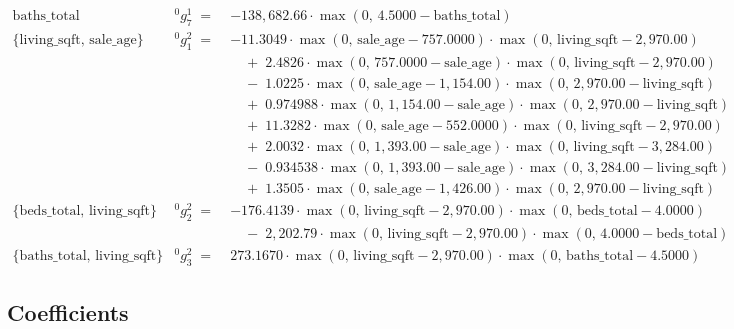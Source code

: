 \documentclass[
]{article}
\begin{document}
\[\begin{array}{lrl}
  \text{baths\_total} & {}^{0}g^{1}_{7} \;=\; & -138,682.66 \cdot \max(0,\, 4.5000 - \text{baths\_total}) \\
  \{\text{living\_sqft},\, \text{sale\_age}\} & {}^{0}g^{2}_{1} \;=\; & -11.3049 \cdot \max(0,\, \text{sale\_age} - 757.0000) \cdot \max(0,\, \text{living\_sqft} - 2,970.00) \\
  & & \quad + \; 2.4826 \cdot \max(0,\, 757.0000 - \text{sale\_age}) \cdot \max(0,\, \text{living\_sqft} - 2,970.00) \\
  & & \quad - \; 1.0225 \cdot \max(0,\, \text{sale\_age} - 1,154.00) \cdot \max(0,\, 2,970.00 - \text{living\_sqft}) \\
  & & \quad + \; 0.974988 \cdot \max(0,\, 1,154.00 - \text{sale\_age}) \cdot \max(0,\, 2,970.00 - \text{living\_sqft}) \\
  & & \quad + \; 11.3282 \cdot \max(0,\, \text{sale\_age} - 552.0000) \cdot \max(0,\, \text{living\_sqft} - 2,970.00) \\
  & & \quad + \; 2.0032 \cdot \max(0,\, 1,393.00 - \text{sale\_age}) \cdot \max(0,\, \text{living\_sqft} - 3,284.00) \\
  & & \quad - \; 0.934538 \cdot \max(0,\, 1,393.00 - \text{sale\_age}) \cdot \max(0,\, 3,284.00 - \text{living\_sqft}) \\
  & & \quad + \; 1.3505 \cdot \max(0,\, \text{sale\_age} - 1,426.00) \cdot \max(0,\, 2,970.00 - \text{living\_sqft}) \\
  \{\text{beds\_total},\, \text{living\_sqft}\} & {}^{0}g^{2}_{2} \;=\; & -176.4139 \cdot \max(0,\, \text{living\_sqft} - 2,970.00) \cdot \max(0,\, \text{beds\_total} - 4.0000) \\
  & & \quad - \; 2,202.79 \cdot \max(0,\, \text{living\_sqft} - 2,970.00) \cdot \max(0,\, 4.0000 - \text{beds\_total}) \\
  \{\text{baths\_total},\, \text{living\_sqft}\} & {}^{0}g^{2}_{3} \;=\; & 273.1670 \cdot \max(0,\, \text{living\_sqft} - 2,970.00) \cdot \max(0,\, \text{baths\_total} - 4.5000)
\end{array} 
\]

\subsection{Coefficients}\label{coefficients}
\end{document}
